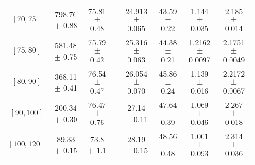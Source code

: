 \begin{tabular}{c||c|c|c|c|c|c|c}
$[70, 75]$ & 798.76 $\pm$ 0.88 & 75.81 $\pm$ 0.48 &  & 24.913 $\pm$ 0.065 & 43.59 $\pm$ 0.22 & 1.144 $\pm$ 0.035 & 2.185 $\pm$ 0.014\\
$[75, 80]$ & 581.48 $\pm$ 0.75 & 75.79 $\pm$ 0.42 &  & 25.316 $\pm$ 0.063 & 44.38 $\pm$ 0.21 & 1.2162 $\pm$ 0.0097 & 2.1751 $\pm$ 0.0049\\
$[80, 90]$ & 368.11 $\pm$ 0.41 & 76.54 $\pm$ 0.47 &  & 26.054 $\pm$ 0.070 & 45.86 $\pm$ 0.24 & 1.139 $\pm$ 0.016 & 2.2172 $\pm$ 0.0067\\
$[90, 100]$ & 200.34 $\pm$ 0.30 & 76.47 $\pm$ 0.76 &  & 27.14 $\pm$ 0.11 & 47.64 $\pm$ 0.39 & 1.069 $\pm$ 0.046 & 2.267 $\pm$ 0.018\\
$[100, 120]$ & 89.33 $\pm$ 0.15 & 73.8 $\pm$ 1.1 &  & 28.19 $\pm$ 0.15 & 48.56 $\pm$ 0.48 & 1.001 $\pm$ 0.093 & 2.314 $\pm$ 0.036\\
\end{tabular}
